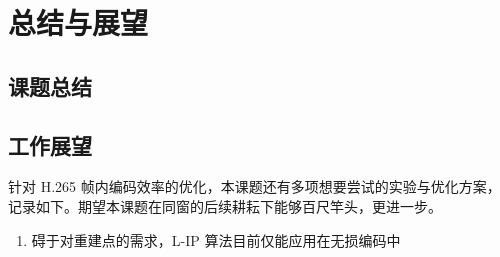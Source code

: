 \chapter{总结与展望}
\label{cha:c5}

\section{课题总结}

\section{工作展望}
针对 H.265 帧内编码效率的优化，本课题还有多项想要尝试的实验与优化方案，记录如下。期望本课题在同窗的后续耕耘下能够百尺竿头，更进一步。
\begin{enumerate}
    \item 碍于对重建点的需求，L-IP 算法目前仅能应用在无损编码中
    
\end{enumerate}
